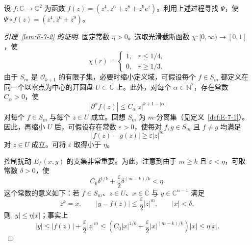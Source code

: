 \begin{exercise}\label{ex:E-7-4}
设 $f:\mathbb C\to\mathbb C^2$ 为函数 $f(z)=(z^4,z^6+z^8+z^9e^z)$。利用上述过程寻找 $\Psi$，使 $\Psi\circ f(z)=(z^4,z^6+z^9)$。
\end{exercise}

\begin{proof}[引理~\ref{lem:E-7-2} 的证明]
固定常数 $\eta>0$。选取光滑截断函数 $\chi:[0,\infty)\to[0,1]$，使
\[
  \chi(r)=\begin{cases}
    1,&r\le1/4,\\
    0,&r\ge1/3.
  \end{cases}
\]
由于 $S_m$ 是 $\mathcal O_{k+1}$ 的有限子集，必要时缩小定义域，可假设每个 $f\in S_m$ 都定义在同一个以零点为中心的开圆盘 $U\subset\mathbb C$ 上。此外，对每个 $\alpha\in\mathbb N^2$，存在常数 $C_\alpha>0$，使
\[
  |\partial^\alpha f(z)|\le C_\alpha|z|^{k+1-|\alpha|}
\]
对每个 $f\in S_m$ 与每个 $z\in U$ 成立。回想 $S_m$ 为 $m$-分离集（见定义~\ref{def:E-7-1}）。因此，再缩小 $U$ 后，可假设存在常数 $\varepsilon>0$，使每对 $f,g\in S_m$ 且 $f\ne g$ 均满足
\begin{equation}\label{eq:E-7-3}
  |f(z)-g(z)|\ge\varepsilon|z|^m
\end{equation}
对 $z\in U$ 成立。可将 $\varepsilon$ 取得小于 $\eta$。

控制扰动 $E_\Gamma(x,y)$ 的支集非常重要。为此，注意到由于 $m\ge k$ 且 $\varepsilon<\eta$，可取常数 $\delta>0$，使
\[
  C_0\delta^{1/k}
    +\frac\varepsilon2\delta^{(m-k)/k}<\eta.
\]
这个常数的意义如下：若 $f\in S_m$、$z\in U$、$x\in\mathbb C$ 与 $y\in\mathbb C^{n-1}$ 满足
\begin{equation}\label{eq:E-7-4}
  z^k=x,\qquad |y-f(z)|\le\frac\varepsilon2|z|^m,
  \qquad |x|<\delta,
\end{equation}
则 $|y|\le\eta|x|$；事实上
\begin{equation}\label{eq:E-7-5}
  |y|\le|f(z)|+\frac\varepsilon2|z|^m
  \le\left(C_0|x|^{1/k}
    +\frac\varepsilon2|x|^{(m-k)/k}\right)|x|
  \le\eta|x|.
\end{equation}


\end{proof}

